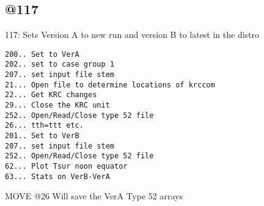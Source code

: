 \documentclass{article}  %
\begin{document}
\subsection{@117} %
117:  Sets Version A to new run and version B to latest in the distro
 
\vspace{-3.mm} 
\begin{verbatim}
200.. Set to VerA 
202.. set to case group 1
207.. set input file stem
21... Open file to determine locations of krccom
22... Get KRC changes
29... Close the KRC unit
252.. Open/Read/Close type 52 file
26... tth=ttt etc.
201.. Set to VerB
207.. set input file stem
252.. Open/Read/Close type 52 file
62... Plot Tsur noon equator
63... Stats on VerB-VerA
\end{verbatim}
  
 MOVE @26 Will save the VerA Type 52 arrays
\end{document}
